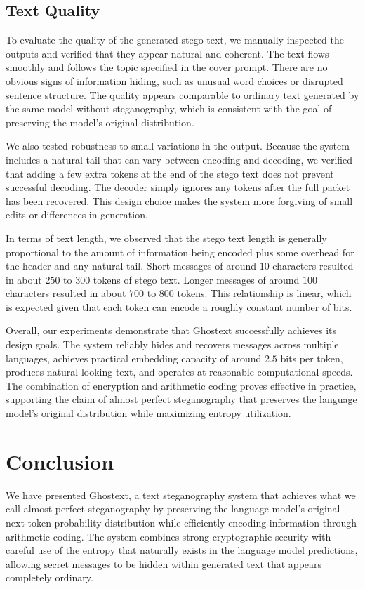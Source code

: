 \documentclass[sigconf,review,anonymous]{acmart}
\begin{document}
{\subsection{Text Quality}

To evaluate the quality of the generated stego text, we manually inspected the outputs and verified that they appear natural and coherent. The text flows smoothly and follows the topic specified in the cover prompt. There are no obvious signs of information hiding, such as unusual word choices or disrupted sentence structure. The quality appears comparable to ordinary text generated by the same model without steganography, which is consistent with the goal of preserving the model's original distribution.

We also tested robustness to small variations in the output. Because the system includes a natural tail that can vary between encoding and decoding, we verified that adding a few extra tokens at the end of the stego text does not prevent successful decoding. The decoder simply ignores any tokens after the full packet has been recovered. This design choice makes the system more forgiving of small edits or differences in generation.

In terms of text length, we observed that the stego text length is generally proportional to the amount of information being encoded plus some overhead for the header and any natural tail. Short messages of around $10$ characters resulted in about $250$ to $300$ tokens of stego text. Longer messages of around $100$ characters resulted in about $700$ to $800$ tokens. This relationship is linear, which is expected given that each token can encode a roughly constant number of bits.

Overall, our experiments demonstrate that Ghostext successfully achieves its design goals. The system reliably hides and recovers messages across multiple languages, achieves practical embedding capacity of around $2.5$ bits per token, produces natural-looking text, and operates at reasonable computational speeds. The combination of encryption and arithmetic coding proves effective in practice, supporting the claim of almost perfect steganography that preserves the language model's original distribution while maximizing entropy utilization.

\section{Conclusion}

We have presented Ghostext, a text steganography system that achieves what we call almost perfect steganography by preserving the language model's original next-token probability distribution while efficiently encoding information through arithmetic coding. The system combines strong cryptographic security with careful use of the entropy that naturally exists in the language model predictions, allowing secret messages to be hidden within generated text that appears completely ordinary.

}
\end{document}
